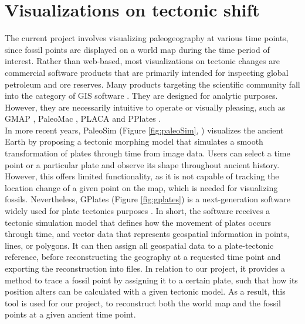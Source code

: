 \documentclass[11pt, a4paper,oneside,chapterprefix=false]{scrbook}
\begin{document}
\newpage

\section{Visualizations on tectonic shift}
The current project involves visualizing paleogeography at various time points, since fossil points are displayed on a world map during the time period of interest. Rather than web-based, most visualizations on tectonic changes are commercial software products that are primarily intended for inspecting global petroleum and ore reserves.  Many products targeting the scientific community fall into the category of GIS software \cite{steiniger2010gis}. They are designed for analytic purposes. However, they are necessarily intuitive to operate or visually pleasing, such as GMAP \cite{torsvik1999plate}, PaleoMac \cite{cogne2003paleomac}, PLACA \cite{matias2005placa} and PPlates \cite{smith2007re}. \\

In more recent years, PaleoSim (Figure \ref{fig:paleoSim}, \cite{rogge2010visualization}) visualizes the ancient Earth by proposing a tectonic morphing model that simulates a smooth transformation of plates through time from image data. Users can select a time point or a particular plate and observe its shape throughout ancient history. However, this offers limited functionality, as it is not capable of tracking the location change of a given point on the map, which is needed for visualizing fossils. Nevertheless, GPlates (Figure \ref{fig:gplates}) is a next-generation software widely used for plate tectonics purposes \cite{boyden2011next} \cite{williams2012open} \cite{gurnis2012plate}. In short, the software receives a tectonic simulation model that defines how the movement of plates occurs through time, and vector data that represents geospatial information in points, lines, or polygons. It can then assign all geospatial data to a plate-tectonic reference, before reconstructing the geography at a requested time point and exporting the reconstruction into files. In relation to our project, it provides a method to trace a fossil point by assigning it to a certain plate, such that how its position alters can be calculated with a given tectonic model. As a result, this tool is used for our project, to reconstruct both the world map and the fossil points at a given ancient time point. \\
\end{document}
